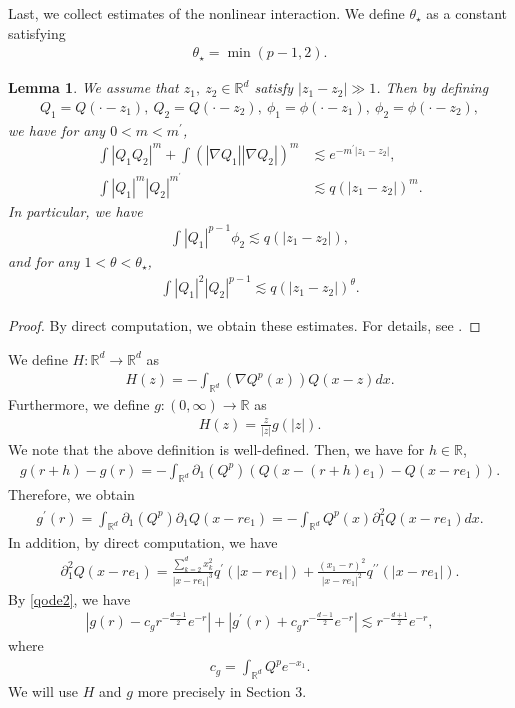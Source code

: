 \documentclass[reqno]{amsart}
\theoremstyle{plain}
\newtheorem{lemma}[theorem]{Lemma}
\theoremstyle{definition}
\numberwithin{equation}{section}
\newcommand{\1}{\mathbbm{1}}
\begin{document}
Last, we collect estimates of the nonlinear interaction. We define $\theta_{\star}$ as a constant satisfying
\begin{align}\label{thetastar}
\theta_{\star}=\min{(p-1,2)}.
\end{align}
\begin{lemma}\label{ni}
We assume that $z_1,\ z_2\in \mathbb{R}^d$ satisfy $|z_1-z_2|\gg 1$. Then by defining
\begin{align*}
Q_1=Q(\cdot-z_1),\ Q_2=Q(\cdot-z_2),\ \phi_1=\phi(\cdot-z_1),\ \phi_2=\phi(\cdot-z_2),
\end{align*}
we have for any $0<m<m^{\prime}$,
\begin{align}
\int |Q_1Q_2|^m+\int (|\nabla Q_1||\nabla Q_2|)^m &\lesssim e^{-m^{\prime}|z_1-z_2|}, \label{si1}
\\
\int |Q_1|^m|Q_2|^{m^{\prime}}&\lesssim q(|z_1-z_2|)^m. \label{si2}
\end{align}
In particular, we have
\begin{align*}
\int |Q_1|^{p-1}\phi_2\lesssim q(|z_1-z_2|),
\end{align*}
and for any $1<\theta<\theta_{\star}$, 
\begin{align*}
\int |Q_1|^2|Q_2|^{p-1}\lesssim q(|z_1-z_2|)^{\theta}.
\end{align*}
\end{lemma}
\begin{proof}
By direct computation, we obtain these estimates.  For details, see \cite[Lemma 7]{N2}. 
\end{proof}




We define $H:\mathbb{R}^d\to \mathbb{R}^d$ as 
\begin{align}\label{Hdef}
H(z)=-\int_{\mathbb{R}^d}(\nabla Q^p(x))Q(x-z)dx.
\end{align}
Furthermore, we define $g:(0,\infty)\to \mathbb{R}$ as
\begin{align*}
H(z)=\frac{z}{|z|} g(|z|).
\end{align*}
We note that the above definition is well-defined. Then, we have for $h\in \mathbb{R}$,
\begin{align*}
g(r+h)-g(r)=-\int_{\mathbb{R}^d} {\partial}_1(Q^p)\left( Q(x-(r+h)e_1)-Q(x-re_1)\right).
\end{align*}
Therefore, we obtain
\begin{align*}
g^{\prime}(r)=\int_{\mathbb{R}^d} {\partial}_1(Q^p){\partial}_1Q(x-re_1)=-\int_{\mathbb{R}^d}Q^p(x){\partial}_1^2Q(x-re_1)dx.
\end{align*}
In addition, by direct computation, we have
\begin{align*}
{\partial}_1^2Q(x-re_1)=\frac{\sum_{k=2}^dx_k^2}{|x-re_1|^3}q^{\prime}(|x-re_1|)+\frac{(x_1-r)^2}{|x-re_1|^2}q^{\prime \prime}(|x-re_1|).
\end{align*}
By \eqref{qode2}, we have
\begin{align*}
|g(r)-c_gr^{-\frac{d-1}{2}}e^{-r}|+|g^{\prime}(r)+c_gr^{-\frac{d-1}{2}}e^{-r}|\lesssim r^{-\frac{d+1}{2}}e^{-r},
\end{align*}
where 
\begin{align*}
c_g=\int_{\mathbb{R}^d} Q^pe^{-x_1}.
\end{align*}
We will use $H$ and $g$ more precisely in Section 3.
\end{document}
